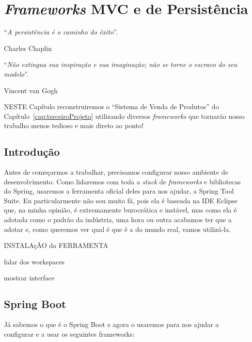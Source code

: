 \chapter{\textit{Frameworks} MVC e de Persistência}\label{cap:frameworksPersistencia}
\epigraph{``\textit{A persistência é o caminho do êxito}''.}{Charles Chaplin}
\epigraph{``\textit{Não extingua sua inspiração e sua imaginação; não se torne o escravo do seu modelo}''.}{Vincent van Gogh}

\lettrine[lines=4, lhang=0.1, lraise=0, loversize=0.2, findent=0.1em]{\textcolor{corAzulTema}{N}}{ESTE} Capítulo reconstruiremos o ``Sistema de Venda de Produtos'' do Capítulo~\ref{cap:terceiroProjeto} utilizando diversos \textit{frameworks} que tornarão nosso trabalho menos tedioso e mais direto ao ponto!

\vfill

\section{Introdução}

Antes de começarmos a trabalhar, precisamos configurar nosso ambiente de desenvolvimento. Como lidaremos com toda a \textit{stack} de \textit{frameworks} e bibliotecas do Spring, usaremos a ferramenta oficial deles para nos ajudar, a Spring Tool Suite. Eu particularmente não sou muito fã, pois ela é baseada na IDE Eclipse que, na minha opinião, é extremamente burocrática e instável, mas como ela é adotada como o padrão da indústria, uma hora ou outra acabamos ter que a adotar e, como queremos ver qual é que é a do mundo real, vamos utilizá-la.

INSTALAçÂO da FERRAMENTA

falar dos workspaces

mostrar interface


\section{Spring Boot}

Já sabemos o que é o Spring Boot e agora o usaremos para nos ajudar a configurar e a usar os seguintes frameworks:

